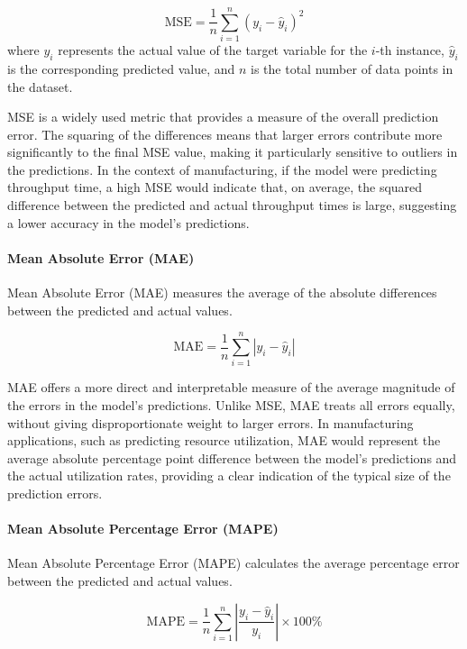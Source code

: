 \begin{equation}
  \text{MSE} = \frac{1}{n} \sum_{i=1}^{n} (y_i - \hat{y}_i)^2
\end{equation}
where $y_i$ represents the actual value of the target variable for the $i$-th instance, $\hat{y}_i$ is the corresponding predicted value, and $n$ is the total number of data points in the dataset.

MSE is a widely used metric that provides a measure of the overall prediction error. The squaring of the differences means that larger errors contribute more significantly to the final MSE value, making it particularly sensitive to outliers in the predictions. In the context of manufacturing, if the model were predicting throughput time, a high MSE would indicate that, on average, the squared difference between the predicted and actual throughput times is large, suggesting a lower accuracy in the model's predictions.

\paragraph{\textbf{Mean Absolute Error (MAE)}}
Mean Absolute Error (MAE) measures the average of the absolute differences between the predicted and actual values.

\begin{equation}
  \text{MAE} = \frac{1}{n} \sum_{i=1}^{n} |y_i - \hat{y}_i|
\end{equation}

MAE offers a more direct and interpretable measure of the average magnitude of the errors in the model's predictions. Unlike MSE, MAE treats all errors equally, without giving disproportionate weight to larger errors. In manufacturing applications, such as predicting resource utilization, MAE would represent the average absolute percentage point difference between the model's predictions and the actual utilization rates, providing a clear indication of the typical size of the prediction errors.

\paragraph{\textbf{Mean Absolute Percentage Error (MAPE)}}
Mean Absolute Percentage Error (MAPE) calculates the average percentage error between the predicted and actual values.

\begin{equation}
  \text{MAPE} = \frac{1}{n} \sum_{i=1}^{n} \left| \frac{y_i - \hat{y}_i}{y_i} \right| \times 100\%
\end{equation}

